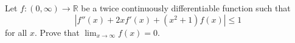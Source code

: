 Let \(f \colon (0,\infty) \to \mathbb{R}\) be a twice continuously differentiable function such that
\[
|f''(x) + 2x f'(x) + (x^2 + 1) f(x)| \le 1
\]
for all \(x\). Prove that \(\lim_{x \to \infty} f(x) = 0\).